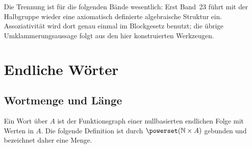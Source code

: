 \documentclass[main.tex]{subfiles}
\begin{document}
Die Trennung ist für die folgenden Bände wesentlich: Erst Band~23 führt mit
der Halbgruppe wieder eine axiomatisch definierte algebraische Struktur ein.
Assoziativität wird dort genau einmal im Blockgesetz benutzt; die übrige
Umklammerungsaussage folgt aus den hier konstruierten Werkzeugen.

\chapter{Endliche Wörter}

\section{Wortmenge und Länge}

Ein Wort über \(A\) ist der Funktionsgraph einer nullbasierten endlichen
Folge mit Werten in \(A\). Die folgende Definition ist durch
\(\powerset(\mathbb N\times A)\) gebunden und bezeichnet daher eine Menge.

\end{document}
